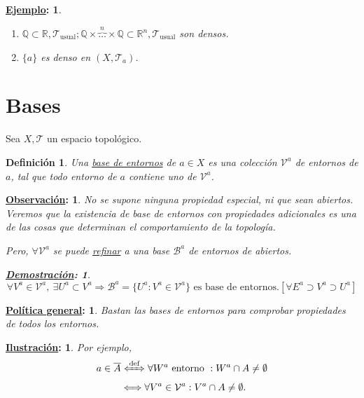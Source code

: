 \documentclass[10pt,a4paper,openright]{book}
\theoremstyle{break}
\newtheorem*{defi}{Definición}
\newtheorem*{demo}{\underline{Demostración}:}
\newtheorem*{obs}{\underline{Observación}:}
\newtheorem*{ej}{\underline{Ejemplo}:}
\newtheorem*{pg}{\underline{Política general}:}
\newtheorem*{il}{\underline{Ilustración}:}
\begin{document}
\begin{ej}
\begin{enumerate}
    \item $\mathbb{Q} \subset \mathbb{R}, \mathcal{T}_{\text{usual}}; \mathbb{Q} \times \overbrace{\ldots}^{n} \times \mathbb{Q} \subset \mathbb{R}^n, \mathcal{T}_{\text{usual}}$ son densos.
    \item $\{a\}$ es denso en $\left( X, \mathcal{T}_a \right)$.
\end{enumerate}
\end{ej}

\section{Bases}%
\label{sec:bases}
Sea $X, \mathcal{T}$ un espacio topológico.
\begin{defi}
Una \underline{base de entornos} de $a \in X$ es una colección $\mathcal{V}^a$ de entornos de $a$, tal que todo entorno de $a$ contiene uno de $\mathcal{V}^a$.
\end{defi}

\begin{obs}
No se supone ninguna propiedad especial, ni que sean abiertos. Veremos que la existencia de base de entornos con propiedades adicionales es una de las cosas que determinan el comportamiento de la topología.

Pero, $\forall \mathcal{V}^a$ se puede \underline{refinar} a una base $\mathcal{B}^a$ de entornos de abiertos. 
\begin{demo}    
\[
\forall V^a \in \mathcal{V}^a,\ \exists U^a \subset V^a \Rightarrow \mathcal{B}^a = \{U^a: V^a \in \mathcal{V}^a\} \text{ es base de entornos}. \left[ \forall E^a \supset V^a \supset U^a \right] 
\]
\end{demo}
\end{obs}

\begin{pg}
    Bastan las bases de entornos para comprobar propiedades de todos los entornos.
\end{pg}

\begin{il}    
Por ejemplo,
\begin{align*}
    a \in \overline{A} &\xLeftrightarrow{\text{def}} \forall W^a \text{ entorno }: W^a \cap A \neq \emptyset\\
   &\Longleftrightarrow \forall V^a \in \mathcal{V}^a: V^a\cap A \neq \emptyset 
.\end{align*}
\end{il}
\end{document}
